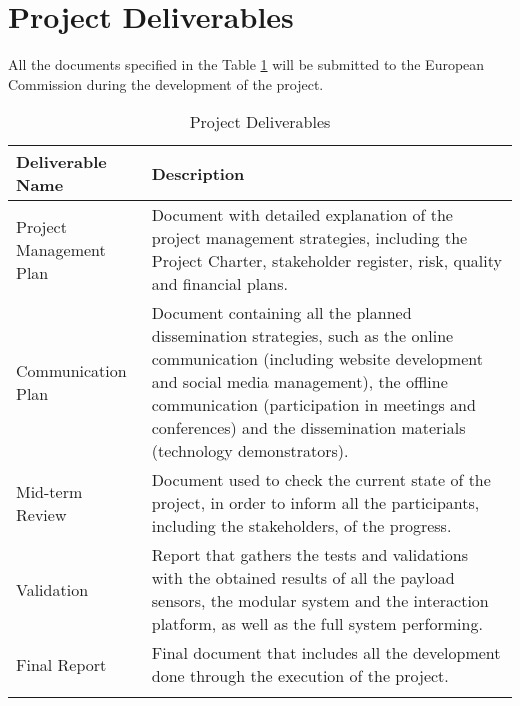 \section{Project Deliverables}

All the documents specified in the Table \ref{PDel} will be submitted to the European Commission during the development of the project. 

\begin{longtable}[H]{lp{10cm}}
	
	\toprule[2pt]
	
	\textbf{Deliverable Name} & \textbf{Description} \\ 
	
	\midrule[1.5pt] 
	\endhead
	
	
	Project Management Plan & 
	Document with detailed explanation of the project management strategies, including the Project Charter, stakeholder register, risk, quality and financial plans. \vspace{0.2cm}
	\\ \midrule
	
	Communication Plan  & 
	Document containing all the planned dissemination strategies, such as the online communication (including website development and social media management), the offline communication (participation in meetings and conferences) and the dissemination materials (technology demonstrators). \vspace{0.2cm}
	\\ \midrule
	
	Mid-term Review & 
	Document used to check the current state of the project, in order to inform all the participants, including the stakeholders, of the progress. \vspace{0.2cm}
	\\ \midrule
	
	Validation & 
	Report that gathers the tests and validations with the obtained results of all the payload sensors, the modular system and the interaction platform, as well as the full system performing. \vspace{0.2cm}
	\\ \midrule
		
	Final Report & 
	Final document that includes all the development done through the execution of the project. \vspace{0.2cm}

	\\ \bottomrule[2pt]
	
	\caption{Project Deliverables}
	\label{PDel}

\end{longtable}